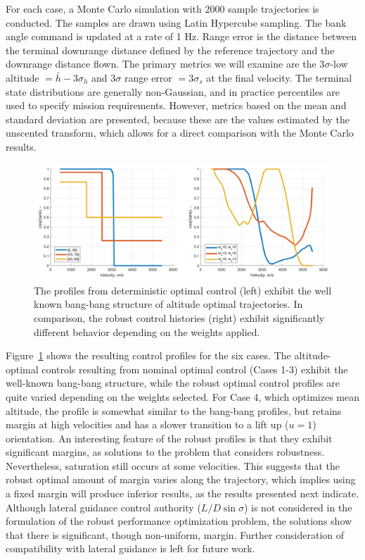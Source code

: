 \documentclass[journal ]{new-aiaa}
\begin{document}
For each case, a Monte Carlo simulation with 2000 sample trajectories is conducted. The samples are drawn using Latin Hypercube sampling. The bank angle command is updated at a rate of 1 Hz. Range error is the distance between the terminal downrange distance defined by the reference trajectory and the downrange distance flown. The primary metrics we will examine are the 3$\sigma$-low altitude $=\bar{h}-3\sigma_h$ and 3$\sigma$ range error $= 3\sigma_s$ at the final velocity. The terminal state distributions are generally non-Gaussian, and in practice percentiles are used to specify mission requirements. However, metrics based on the mean and standard deviation are presented, because these are the values estimated by the unscented transform, which allows for a direct comparison with the Monte Carlo results.
\begin{figure}[h!]
	\centering
	\includegraphics[width=1\textwidth]{ddp/comparison_controls}
	\caption{The profiles from deterministic optimal control (left) exhibit the well known bang-bang structure of altitude optimal trajectories. In comparison, the robust control histories (right) exhibit significantly different behavior depending on the weights applied.}
	\label{fig_control_comparison}
\end{figure}

Figure~\ref{fig_control_comparison} shows the resulting control profiles for the six cases. The altitude-optimal controls resulting from nominal optimal control (Cases 1-3) exhibit the well-known bang-bang structure, while the robust optimal control profiles are quite varied depending on the weights selected. For Case 4, which optimizes mean altitude, the profile is somewhat similar to the bang-bang profiles, but retains margin at high velocities and has a slower transition to a lift up ($u=1$) orientation. An interesting feature of the robust profiles is that they exhibit significant margins, as solutions to the problem that considers robustness. Nevertheless, saturation still occurs at some velocities. This suggests that the robust optimal amount of margin varies along the trajectory, which implies using a fixed margin will produce inferior results, as the results presented next indicate. Although lateral guidance control authority ($L/D \sin\sigma$) is not considered in the formulation of the robust performance optimization problem, the solutions show that there is significant, though non-uniform, margin. Further consideration of compatibility with lateral guidance is left for future work. 
\end{document}
